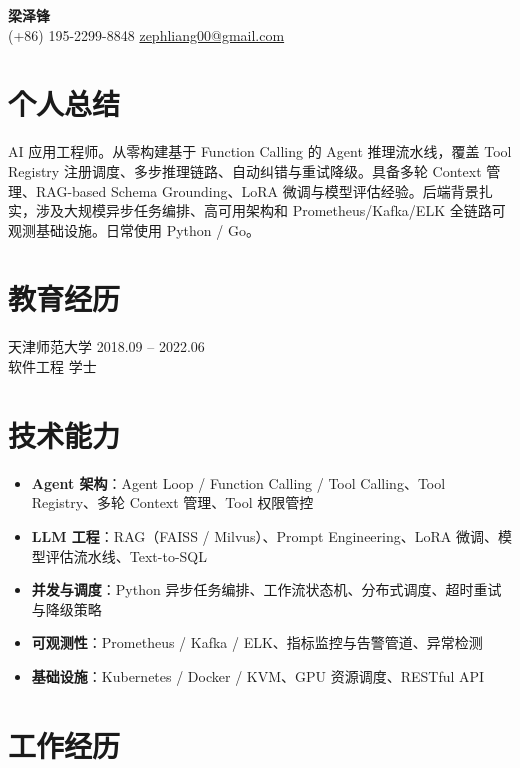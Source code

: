 \documentclass[10pt, a4paper]{article}
\begin{document}
\begin{center}
  {\LARGE\bfseries 梁泽锋}\\[0.15em]
  {\small (+86) 195-2299-8848 \quad \href{mailto:zephliang00@gmail.com}{zephliang00@gmail.com}}
\end{center}

\section{个人总结}
AI 应用工程师。从零构建基于 Function Calling 的 Agent 推理流水线，覆盖 Tool Registry 注册调度、多步推理链路、自动纠错与重试降级。具备多轮 Context 管理、RAG-based Schema Grounding、LoRA 微调与模型评估经验。后端背景扎实，涉及大规模异步任务编排、高可用架构和 Prometheus/Kafka/ELK 全链路可观测基础设施。日常使用 Python / Go。

\section{教育经历}
\noindent 天津师范大学 \hfill 2018.09 -- 2022.06\\
软件工程 \quad 学士

\section{技术能力}
\begin{itemize}
  \item \textbf{Agent 架构}：Agent Loop / Function Calling / Tool Calling、Tool Registry、多轮 Context 管理、Tool 权限管控
  \item \textbf{LLM 工程}：RAG（FAISS / Milvus）、Prompt Engineering、LoRA 微调、模型评估流水线、Text-to-SQL
  \item \textbf{并发与调度}：Python 异步任务编排、工作流状态机、分布式调度、超时重试与降级策略
  \item \textbf{可观测性}：Prometheus / Kafka / ELK、指标监控与告警管道、异常检测
  \item \textbf{基础设施}：Kubernetes / Docker / KVM、GPU 资源调度、RESTful API
\end{itemize}

\section{工作经历}
\end{document}
